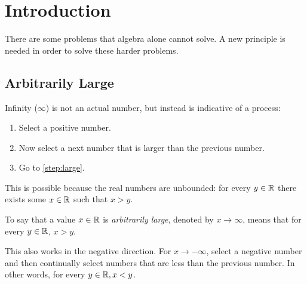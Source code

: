 \documentclass[letterpaper,12pt,fleqn]{article}
\begin{document}
\section*{Introduction}

There are some problems that algebra alone cannot solve.  A new principle is needed in order to solve these
harder problems.

\subsection*{Arbitrarily Large}

Infinity (\(\infty\)) is not an actual number, but instead is indicative of a process:

\begin{enumerate}
\item Select a positive number.
\item\label{step:large} Now select a next number that is larger than the previous number.
\item Go to \ref{step:large}.
\end{enumerate}

This is possible because the real numbers are unbounded: for every \(y\in\mathbb{R}\) there exists some \(x\in\mathbb{R}\) such
that \(x>y\).

\bigskip

\begin{center}
\end{center}

\begin{definition}
  To say that a value \(x\in\mathbb{R}\) is \emph{arbitrarily large}, denoted by \(x\to\infty\), means that for every
  \(y\in\mathbb{R}\), \(x>y\).
\end{definition}

This also works in the negative direction.  For \(x\to-\infty\), select a negative number and then continually
select numbers that are less than the previous number.  In other words, for every \(y\in\mathbb{R},x<y\).

\bigskip

\begin{center}
\end{center}
\end{document}
